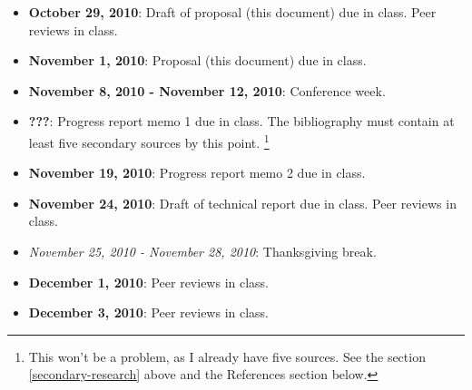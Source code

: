 \documentclass[12pt]{article}
\begin{document}
\begin{itemize}
\item \textbf{October 29, 2010}: Draft of proposal (this document) due
in class.  Peer reviews in class.
\item \textbf{November 1, 2010}: Proposal (this document) due in class. 
\item \textbf{November 8, 2010 - November 12, 2010}: Conference week. 
\item \textbf{???}: Progress report memo 1 due in class.  The bibliography must contain at least five secondary sources by this point. \footnote{This won't be a problem, as I already have five sources.  See the section \ref{secondary-research} above and the References section below.}
\item \textbf{November 19, 2010}: Progress report memo 2 due in class.
\item \textbf{November 24, 2010}: Draft of technical report due in
class.  Peer reviews in class.
\item \textit{November 25, 2010 - November 28, 2010}: Thanksgiving break.
\item \textbf{December 1, 2010}: Peer reviews in class.
\item \textbf{December 3, 2010}: Peer reviews in class.
\end{itemize}
\end{document}
